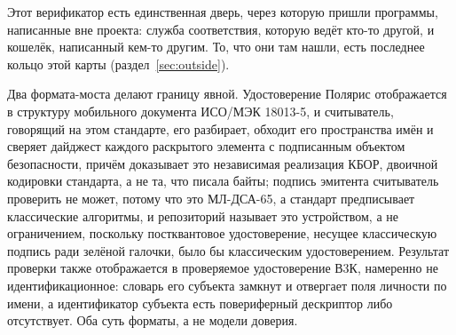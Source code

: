 Этот верификатор есть единственная дверь, через которую пришли программы, написанные вне проекта:
служба соответствия, которую ведёт кто-то другой, и кошелёк, написанный кем-то другим. То, что они там
нашли, есть последнее кольцо этой карты (раздел~\ref{sec:outside}).

Два формата-моста делают границу явной. Удостоверение Полярис отображается в структуру
мобильного документа ИСО/МЭК 18013-5, и считыватель, говорящий на этом стандарте, его разбирает,
обходит его пространства имён и сверяет дайджест каждого раскрытого элемента с подписанным
объектом безопасности, причём доказывает это независимая реализация КБОР, двоичной кодировки стандарта, а не та, что писала
байты; подпись эмитента считыватель проверить не может, потому что это МЛ-ДСА-65, а стандарт
предписывает классические алгоритмы, и репозиторий называет это устройством, а не ограничением,
поскольку постквантовое удостоверение, несущее классическую подпись ради зелёной галочки, было бы
классическим удостоверением. Результат проверки также отображается в проверяемое удостоверение
В3К, намеренно не идентификационное: словарь его субъекта замкнут и отвергает поля личности по
имени, а идентификатор субъекта есть повериферный дескриптор либо отсутствует. Оба суть форматы, а
не модели доверия. \sImpl

